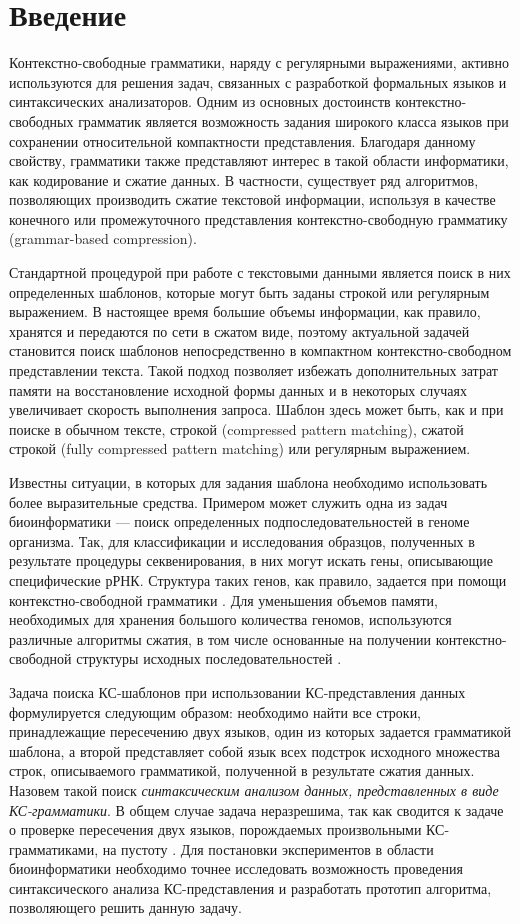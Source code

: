 \section*{Введение}

Контекстно-свободные грамматики, наряду с регулярными выражениями, активно используются для решения задач, связанных с разработкой формальных языков и синтаксических анализаторов. 
Одним из основных достоинств контекстно-свободных грамматик является возможность задания широкого класса языков при сохранении относительной компактности представления. 
Благодаря данному свойству, грамматики также представляют интерес в такой области информатики, как кодирование и сжатие данных. 
В частности, существует ряд алгоритмов, позволяющих производить сжатие текстовой информации, используя в качестве конечного \cite{sequitur} или промежуточного \cite{Arimura} представления контекстно-свободную грамматику (grammar-based compression). 

Стандартной процедурой при работе с текстовыми данными является поиск в них определенных шаблонов, которые могут быть заданы строкой или регулярным выражением. 
В настоящее время большие объемы информации, как правило, хранятся и передаются по сети в сжатом виде, поэтому актуальной задачей становится поиск шаблонов непосредственно в компактном контекстно-свободном представлении текста.
Такой подход позволяет избежать дополнительных затрат памяти на восстановление исходной формы данных и в некоторых случаях увеличивает скорость выполнения запроса.
Шаблон здесь может быть, как и при поиске в обычном тексте, строкой (compressed pattern matching), сжатой строкой (fully compressed pattern matching) или регулярным выражением.

Известны ситуации, в которых для задания шаблона необходимо использовать более выразительные средства. 
Примером может служить одна из задач биоинформатики --- поиск определенных подпоследовательностей в геноме организма. 
Так, для классификации и исследования образцов, полученных в результате процедуры секвенирования, в них могут искать гены, описывающие специфические рРНК. 
Структура таких генов, как правило, задается при помощи контекстно-свободной грамматики \cite{Anderson2013}. 
Для уменьшения объемов памяти, необходимых для хранения большого количества геномов, используются различные алгоритмы сжатия, в том числе основанные на получении контекстно-свободной структуры исходных последовательностей \cite{galle2011dna}.

Задача поиска КС-шаблонов при использовании КС-представления данных формулируется следующим образом: необходимо найти все строки, принадлежащие пересечению двух языков, один из которых задается грамматикой шаблона, а второй представляет собой язык всех подстрок исходного множества строк, описываемого грамматикой, полученной в результате сжатия данных.
Назовем такой поиск \textit{синтаксическим анализом данных, представленных в виде КС-грамматики}.
В общем случае задача неразрешима, так как сводится к задаче о проверке пересечения двух языков, порождаемых произвольными КС-грамматиками, на пустоту \cite{harrison1978empt}.
Для постановки экспериментов в области биоинформатики необходимо точнее исследовать возможность проведения синтаксического анализа КС-представления и разработать прототип алгоритма, позволяющего решить данную задачу.